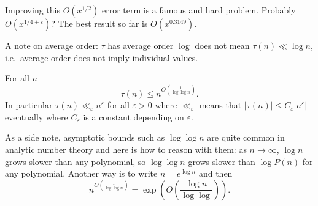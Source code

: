 \documentclass[a4paper]{article}
\begin{document}
\begin{remark}
  Improving this \(O(x^{1/2})\) error term is a famous and hard problem. Probably \(O(x^{1/4 + \varepsilon})\)? The best result so far is \(O(x^{0.3149})\).
\end{remark}

A note on average order: \(\tau\) has average order \(\log\) does not mean \(\tau(n) \ll \log n\), i.e.\ average order does not imply individual values.

\begin{theorem}
  For all \(n\)
  \[
    \tau(n) \leq n^{O(\frac{1}{\log \log n})}.
  \]
  In particular \(\tau(n) \ll_\varepsilon n^\varepsilon\) for all \(\varepsilon > 0\) where \(\ll_\varepsilon\) means that \(|\tau(n)| \leq C_\varepsilon |n^\varepsilon|\) eventually where \(C_\varepsilon\) is a constant depending on \(\varepsilon\).
\end{theorem}

As a side note, asymptotic bounds such as \(\log \log n\) are quite common in analytic number theory and here is how to reason with them: as \(n \to \infty\), \(\log n\) grows slower than any polynomial, so \(\log \log n\) grows slower than \(\log P(n)\) for any polynomial. Another way is to write \(n = e^{\log n}\) and then
\[
  n^{O(\frac{1}{\log \log n})} = \exp (O(\frac{\log n}{\log \log})).
\]
\end{document}
